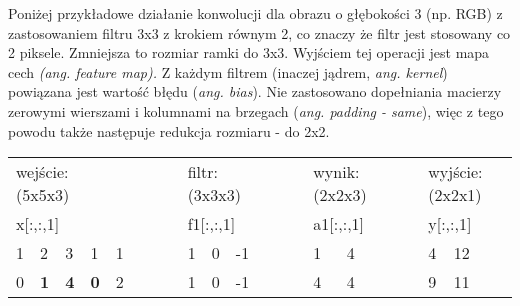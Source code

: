 Poniżej przykładowe działanie konwolucji dla obrazu o głębokości 3 (np. RGB) z zastosowaniem filtru 3x3 z krokiem równym 2, co znaczy że filtr jest stosowany co 2 piksele. Zmniejsza to rozmiar ramki do 3x3. Wyjściem tej operacji jest mapa cech \textit{(ang. feature map).} Z każdym filtrem (inaczej jądrem, \textit{ang. kernel}) powiązana jest wartość błędu (\textit{ang. bias}). Nie zastosowano dopełniania macierzy zerowymi wierszami i kolumnami na brzegach (\textit{ang. padding - same}), więc z tego powodu także następuje redukcja rozmiaru - do 2x2. 

\begin{table}[h]
\begin{tabular}{lllllllllllllllllllllll}
\multicolumn{5}{l}{wejście: (5x5x3)}                                                                                                                   &  &  &                       & \multicolumn{3}{l}{filtr: (3x3x3)}                                          &  &  &                       & \multicolumn{4}{l}{wynik: (2x2x3)}                     &                       & \multicolumn{4}{l}{wyjście: (2x2x1)}                   \\
\multicolumn{5}{l}{x{[}:,:,1{]}}                                                                                                                       &  &  &                       & \multicolumn{3}{l}{f1{[}:,:,1{]}}                                           &  &  &                       & \multicolumn{2}{l}{a1{[}:,:,1{]}}                &  &  &                       & \multicolumn{2}{l}{y{[}:,:,1{]}}                 &  &  \\ \cline{1-5} \cline{9-11} \cline{15-16} \cline{20-21}
\multicolumn{1}{|l|}{1} & \multicolumn{1}{l|}{2}          & \multicolumn{1}{l|}{3}          & \multicolumn{1}{l|}{1}          & \multicolumn{1}{l|}{1} &  &  & \multicolumn{1}{l|}{} & \multicolumn{1}{l|}{1}  & \multicolumn{1}{l|}{0}  & \multicolumn{1}{l|}{-1} &  &  & \multicolumn{1}{l|}{} & \multicolumn{1}{l|}{1}  & \multicolumn{1}{l|}{4} &  &  & \multicolumn{1}{l|}{} & \multicolumn{1}{l|}{4} & \multicolumn{1}{l|}{12} &  &  \\ \cline{1-5} \cline{9-11} \cline{15-16} \cline{20-21}
\multicolumn{1}{|l|}{0} & \multicolumn{1}{l|}{\textbf{1}} & \multicolumn{1}{l|}{\textbf{4}} & \multicolumn{1}{l|}{\textbf{0}} & \multicolumn{1}{l|}{2} &  &  & \multicolumn{1}{l|}{} & \multicolumn{1}{l|}{1}  & \multicolumn{1}{l|}{0}  & \multicolumn{1}{l|}{-1} &  &  & \multicolumn{1}{l|}{} & \multicolumn{1}{l|}{4}  & \multicolumn{1}{l|}{4} &  &  & \multicolumn{1}{l|}{} & \multicolumn{1}{l|}{9} & \multicolumn{1}{l|}{11} &  &  \\ \cline{1-5} \cline{9-11} \cline{15-16} \cline{20-21}

\end{tabular}
\end{table}
